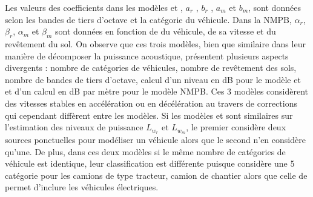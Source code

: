 Les valeurs des coefficients dans les modèles  et , $a_r$ ,  $b_r$ ,  $a_m$  et $b_m$,   sont données selon les bandes de tiers d'octave et la catégorie du véhicule. Dans la NMPB, $\alpha_r$, $\beta_r$, $\alpha_m$ et $\beta_m$ sont données en fonction de du véhicule, de sa vitesse et du revêtement du sol.
On observe que ces trois modèles, bien que similaire dans leur manière de décomposer la puissance acoustique, présentent plusieurs aspects divergents : nombre de catégories de véhicules, nombre de revêtement des sols, nombre de bandes de tiers d'octave, calcul d'un niveau en dB pour le modèle  et  et d'un calcul en dB par mètre pour le modèle NMPB. Ces 3 modèles considèrent des vitesses stables en accélération ou en décélération au travers de corrections qui cependant diffèrent entre les modèles. Si les modèles  et  sont similaires sur l'estimation des niveaux de puissance $L_{w_r}$ et $L_{w_m}$, le premier considère deux sources ponctuelles pour modéliser un véhicule alors que le second n'en considère qu'une. De plus, dans ces deux modèles si le même nombre de catégories de véhicule est identique, leur classification est différente puisque  considère une 5\ieme{} catégorie pour les camions de type tracteur, camion de chantier alors que celle de  permet d'inclure les véhicules électriques.

